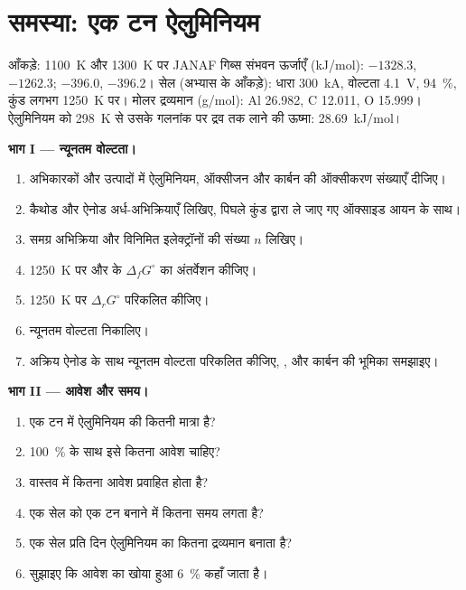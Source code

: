 \section{समस्या: एक टन ऐलुमिनियम}

\begin{problem}
\label{pb:b2:batteries-electrolysis:1}
आँकड़े: \qty{1100}{K} और \qty{1300}{K} पर JANAF गिब्स संभवन ऊर्जाएँ
(\unit{kJ/mol}):  $-1328.3$, $-1262.3$;  $-396.0$, $-396.2$। सेल
(अभ्यास के आँकड़े): धारा \qty{300}{kA}, वोल्टता \qty{4.1}{V}, 
94~\%, कुंड लगभग \qty{1250}{K} पर। मोलर द्रव्यमान (\unit{g/mol}): Al 26.982, C 12.011,
O 15.999। ऐलुमिनियम को \qty{298}{K} से उसके गलनांक पर द्रव तक लाने की
ऊष्मा: \qty{28.69}{kJ/mol}।

\medskip
\noindent\textbf{भाग I --- न्यूनतम वोल्टता।}
\begin{enumerate}
  \item अभिकारकों और उत्पादों में ऐलुमिनियम, ऑक्सीजन और कार्बन की ऑक्सीकरण संख्याएँ
        दीजिए।
  \item कैथोड और ऐनोड अर्ध-अभिक्रियाएँ लिखिए, पिघले कुंड द्वारा ले जाए गए ऑक्साइड आयन
         के साथ।
  \item समग्र अभिक्रिया और विनिमित इलेक्ट्रॉनों की संख्या $n$ लिखिए।
  \item \qty{1250}{K} पर  और  के $\Delta_f G^\circ$ का अंतर्वेशन कीजिए।
  \item \qty{1250}{K} पर $\Delta_r G^\circ$ परिकलित कीजिए।
  \item न्यूनतम वोल्टता निकालिए।
  \item अक्रिय ऐनोड के साथ न्यूनतम वोल्टता परिकलित कीजिए,
        , और कार्बन की भूमिका समझाइए।
\end{enumerate}

\medskip
\noindent\textbf{भाग II --- आवेश और समय।}
\begin{enumerate}[resume]
  \item एक टन में ऐलुमिनियम की कितनी मात्रा है?
  \item 100~\%  के साथ इसे कितना आवेश चाहिए?
  \item वास्तव में कितना आवेश प्रवाहित होता है?
  \item एक सेल को एक टन बनाने में कितना समय लगता है?
  \item एक सेल प्रति दिन ऐलुमिनियम का कितना द्रव्यमान बनाता है?
  \item सुझाइए कि आवेश का खोया हुआ 6~\% कहाँ जाता है।
\end{enumerate}


\end{problem}
